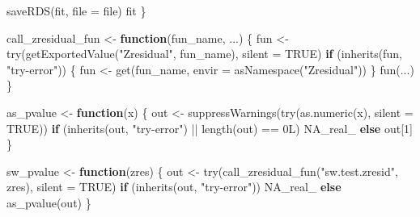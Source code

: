 \documentclass[
  english,
  letterpaper,
  DIV=11,
  numbers=noendperiod]{scrartcl}
\newenvironment{Shaded}{\begin{snugshade}}{\end{snugshade}}
\newcommand{\AttributeTok}[1]{\textcolor[rgb]{0.40,0.45,0.13}{#1}}
\newcommand{\ConstantTok}[1]{\textcolor[rgb]{0.56,0.35,0.01}{#1}}
\newcommand{\ControlFlowTok}[1]{\textcolor[rgb]{0.00,0.23,0.31}{\textbf{#1}}}
\newcommand{\DecValTok}[1]{\textcolor[rgb]{0.68,0.00,0.00}{#1}}
\newcommand{\FunctionTok}[1]{\textcolor[rgb]{0.28,0.35,0.67}{#1}}
\newcommand{\NormalTok}[1]{\textcolor[rgb]{0.00,0.23,0.31}{#1}}
\newcommand{\OtherTok}[1]{\textcolor[rgb]{0.00,0.23,0.31}{#1}}
\newcommand{\SpecialCharTok}[1]{\textcolor[rgb]{0.37,0.37,0.37}{#1}}
\newcommand{\StringTok}[1]{\textcolor[rgb]{0.13,0.47,0.30}{#1}}
\begin{document}
\begin{Shaded}
\begin{Highlighting}[]
  \FunctionTok{saveRDS}\NormalTok{(fit, }\AttributeTok{file =}\NormalTok{ file)}
\NormalTok{  fit}
\NormalTok{\}}

\NormalTok{call\_zresidual\_fun }\OtherTok{\textless{}{-}} \ControlFlowTok{function}\NormalTok{(fun\_name, ...) \{}
\NormalTok{  fun }\OtherTok{\textless{}{-}} \FunctionTok{try}\NormalTok{(}\FunctionTok{getExportedValue}\NormalTok{(}\StringTok{"Zresidual"}\NormalTok{, fun\_name), }\AttributeTok{silent =} \ConstantTok{TRUE}\NormalTok{)}
  \ControlFlowTok{if}\NormalTok{ (}\FunctionTok{inherits}\NormalTok{(fun, }\StringTok{"try{-}error"}\NormalTok{)) \{}
\NormalTok{    fun }\OtherTok{\textless{}{-}} \FunctionTok{get}\NormalTok{(fun\_name, }\AttributeTok{envir =} \FunctionTok{asNamespace}\NormalTok{(}\StringTok{"Zresidual"}\NormalTok{))}
\NormalTok{  \}}
  \FunctionTok{fun}\NormalTok{(...)}
\NormalTok{\}}

\NormalTok{as\_pvalue }\OtherTok{\textless{}{-}} \ControlFlowTok{function}\NormalTok{(x) \{}
\NormalTok{  out }\OtherTok{\textless{}{-}} \FunctionTok{suppressWarnings}\NormalTok{(}\FunctionTok{try}\NormalTok{(}\FunctionTok{as.numeric}\NormalTok{(x), }\AttributeTok{silent =} \ConstantTok{TRUE}\NormalTok{))}
  \ControlFlowTok{if}\NormalTok{ (}\FunctionTok{inherits}\NormalTok{(out, }\StringTok{"try{-}error"}\NormalTok{) }\SpecialCharTok{||} \FunctionTok{length}\NormalTok{(out) }\SpecialCharTok{==} \DecValTok{0}\NormalTok{L) }\ConstantTok{NA\_real\_} \ControlFlowTok{else}\NormalTok{ out[}\DecValTok{1}\NormalTok{]}
\NormalTok{\}}

\NormalTok{sw\_pvalue }\OtherTok{\textless{}{-}} \ControlFlowTok{function}\NormalTok{(zres) \{}
\NormalTok{  out }\OtherTok{\textless{}{-}} \FunctionTok{try}\NormalTok{(}\FunctionTok{call\_zresidual\_fun}\NormalTok{(}\StringTok{"sw.test.zresid"}\NormalTok{, zres), }\AttributeTok{silent =} \ConstantTok{TRUE}\NormalTok{)}
  \ControlFlowTok{if}\NormalTok{ (}\FunctionTok{inherits}\NormalTok{(out, }\StringTok{"try{-}error"}\NormalTok{)) }\ConstantTok{NA\_real\_} \ControlFlowTok{else} \FunctionTok{as\_pvalue}\NormalTok{(out)}
\NormalTok{\}}


\end{Highlighting}
\end{Shaded}
\end{document}
